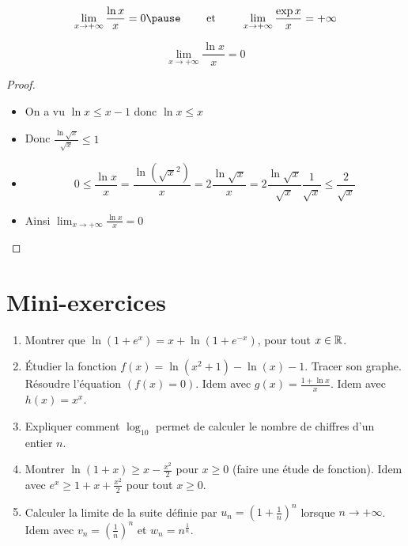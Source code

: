 \begin{frame}

\begin{proposition}
$$\lim_{x\to +\infty} \frac{\ln x}{x} = 0 
\pause \qquad \text{ et }  \qquad 
\lim_{x\to +\infty} \frac{\exp x}{x} = +\infty$$
\end{proposition}

\pause

\end{frame}


\begin{frame}


$$\lim_{x\to +\infty} \frac{\ln x}{x} = 0$$
\pause
\begin{proof}
\begin{itemize}
  \item On a vu $\ln x \le x-1$ donc $\ln x \le x$
\pause  
  \item Donc $\frac{\ln \sqrt x}{\sqrt x} \le 1$
\pause  
  \item 
  $$0 \le \frac{\ln x}{x} = \frac{\ln \left(\sqrt{x}^2\right)}{x} = 2 \frac{\ln \sqrt x}{x} 
  = 2 \frac{\ln \sqrt x}{\sqrt x} \frac{1}{\sqrt x} \le \frac{2}{\sqrt x}$$
\pause  
  \item Ainsi $\displaystyle \lim_{x\to +\infty} \frac{\ln x}{x} = 0$
\end{itemize}
\end{proof}
\end{frame}


\section*{Mini-exercices}


\begin{frame}
\begin{miniexercice}
\begin{enumerate}
  \item Montrer que $\ln(1+e^x) = x + \ln(1+e^{-x})$, pour tout $x \in \mathbb{R}$.
  
  \item \'Etudier la fonction $f(x)=\ln(x^2+1)-\ln(x)-1$. Tracer son graphe. Résoudre l'équation 
  $(f(x)=0)$. Idem avec $g(x)=\frac{1+\ln x}{x}$. Idem avec $h(x)=x^x$.
  
  \item Expliquer comment $\log_{10}$ permet de calculer le nombre de chiffres d'un entier $n$.
  
  \item Montrer $\ln(1+x) \ge x-\frac{x^2}{2}$ pour $x\ge0$ (faire une étude de fonction). Idem avec
  $e^x \ge 1+x+\frac{x^2}{2}$ pour tout $x \ge 0$.
  
  \item Calculer la limite de la suite définie par $u_n=\left(1+\frac1n\right)^n$ lorsque $n\to +\infty$. 
  Idem avec $v_n=\left(\frac1n\right)^n$ et $w_n=n^{\frac1n}$.
\end{enumerate}
\end{miniexercice}


\end{frame}


